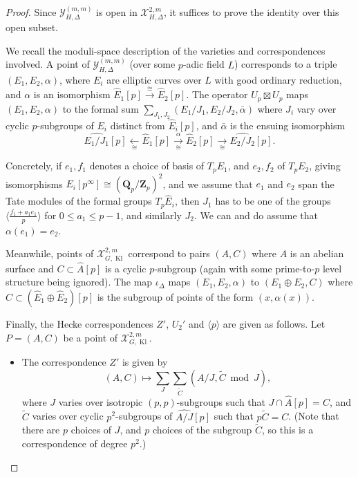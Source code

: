 \documentclass[cjm]{ipart}
\theoremstyle{plain}
\theoremstyle{remark}
\DeclareMathOperator{\Kl}{Kl}
\newcommand{\QQ}{\mathbf{Q}}
\newcommand{\Qp}{\QQ_p}
\newcommand{\Zp}{\mathbf{Z}_p}
\newcommand{\cX}{\mathcal{X}}
\newcommand{\cY}{\mathcal{Y}}
\numberwithin{equation}{subsection}
\renewcommand{\le}{\leqslant}
\begin{document}
  \begin{proof}
   Since $\cY_{H, \Delta}^{(m,m)}$ is open in $\cX_{H, \Delta}^{2,m}$, it suffices to prove the identity over this open subset.

   We recall the moduli-space description of the varieties and correspondences involved. A point of $\cY_{H, \Delta}^{(m,m)}$ (over some $p$-adic field $L$) corresponds to a triple $(E_1, E_2, \alpha)$, where $E_i$ are elliptic curves over $L$ with good ordinary reduction, and $\alpha$ is an isomorphism $\hat{E}_1[p] \xrightarrow{\,\cong\,} \hat{E}_2[p]$. The operator $U_p \boxtimes U_p$ maps $(E_1, E_2, \alpha)$ to the formal sum $\sum_{J_1, J_2} (E_1/J_1, E_2/J_2, \bar{\alpha})$ where $J_i$ vary over cyclic $p$-subgroups of $E_i$ distinct from $\hat{E}_i[p]$, and $\bar\alpha$ is the ensuing isomorphism
   \[ \widehat{E_1/J_1}[p] \xleftarrow[\, \cong\,]{} \hat{E}_1[p] \xrightarrow[\,\cong\,]{\alpha} \hat{E}_2[p] \xrightarrow[\,\cong\,]{} \widehat{E_2/J_2}[p].\]

   Concretely, if $e_1, f_1$ denotes a choice of basis of $T_p E_1$, and $e_2, f_2$ of $T_p E_2$, giving isomorphisms $E_i[p^\infty] \cong (\Qp/\Zp)^2$, and we assume that $e_1$ and $e_2$ span the Tate modules of the formal groups $T_p \hat{E}_i$, then $J_1$ has to be one of the groups $\langle \tfrac{f_1 + a_1 e_1}{p} \rangle$ for $0 \le a_1 \le p-1$, and similarly $J_2$. We can and do assume that $\alpha(e_1) = e_2$.

   Meanwhile, points of $\cX_{G, \Kl}^{2,m}$ correspond to pairs $(A, C)$ where $A$ is an abelian surface and $C \subset \hat{A}[p]$ is a cyclic $p$-subgroup (again with some prime-to-$p$ level structure being ignored). The map $\iota_\Delta$ maps $(E_1, E_2, \alpha)$ to $(E_1 \oplus E_2, C)$ where $C \subset (\hat{E}_1 \oplus \hat{E}_2)[p]$ is the subgroup of points of the form $(x, \alpha(x))$.

   Finally, the Hecke correspondences $Z'$, $U_2'$ and $\langle p \rangle$ are given as follows. Let $P = (A, C)$ be a point of $\cX_{G, \Kl}^{2,m}$.
   \begin{itemize}
    \item The correspondence $Z'$ is given by
    \[ (A, C) \mapsto \sum_J \sum_{\tilde C} (A/J, \tilde C \bmod J),\]
    where $J$ varies over isotropic $(p, p)$-subgroups such that $J \cap \hat{A}[p] = C$, and $\tilde C$ varies over cyclic $p^2$-subgroups of $\widehat{A/J}[p]$ such that $p\tilde C = C$. (Note that there are $p$ choices of $J$, and $p$ choices of the subgroup $\tilde C$, so this is a correspondence of degree $p^2$.)


\end{itemize}
\end{proof}
\end{document}
